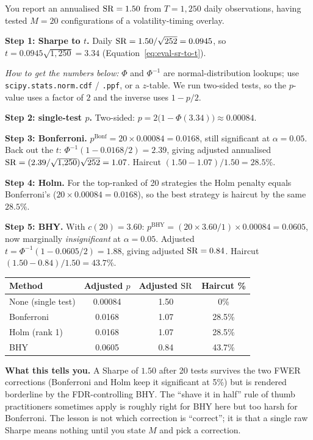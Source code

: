 \begin{workedexample}
You report an annualised $\operatorname{SR} = 1.50$ from $T = 1{,}250$ daily observations, having tested $M = 20$ configurations of a volatility-timing overlay.

\textbf{Step 1: Sharpe to $t$.} Daily $\operatorname{SR} = 1.50/\sqrt{252} = 0.0945$, so $t = 0.0945\sqrt{1{,}250} = 3.34$ (Equation~\eqref{eq:eval-sr-to-t}).

\textit{How to get the numbers below:} $\Phi$ and $\Phi^{-1}$ are normal-distribution lookups; use \texttt{scipy.stats.norm.cdf} / \texttt{.ppf}, or a $z$-table. We run two-sided tests, so the $p$-value uses a factor of $2$ and the inverse uses $1 - p/2$.

\textbf{Step 2: single-test $p$.} Two-sided: $p = 2\bigl(1 - \Phi(3.34)\bigr) \approx 0.00084$.

\textbf{Step 3: Bonferroni.} $p^{\text{Bonf}} = 20 \times 0.00084 = 0.0168$, still significant at $\alpha = 0.05$. Back out the $t$: $\Phi^{-1}(1 - 0.0168/2) = 2.39$, giving adjusted annualised $\operatorname{SR} = (2.39/\sqrt{1{,}250})\sqrt{252} = 1.07$. Haircut $(1.50 - 1.07)/1.50 = 28.5\%$.

\textbf{Step 4: Holm.} For the top-ranked of 20 strategies the Holm penalty equals Bonferroni's ($20 \times 0.00084 = 0.0168$), so the best strategy is haircut by the same $28.5\%$.

\textbf{Step 5: BHY.} With $c(20) = 3.60$: $p^{\text{BHY}} = (20 \times 3.60 / 1)\times 0.00084 = 0.0605$, now marginally \emph{insignificant} at $\alpha = 0.05$. Adjusted $t = \Phi^{-1}(1 - 0.0605/2) = 1.88$, giving adjusted $\operatorname{SR} = 0.84$. Haircut $(1.50 - 0.84)/1.50 = 43.7\%$.

\medskip
\begin{center}
\begin{tabular}{lccc}
\toprule
\textbf{Method} & \textbf{Adjusted $p$} & \textbf{Adjusted $\operatorname{SR}$} & \textbf{Haircut \%} \\
\midrule
None (single test) & 0.00084 & 1.50 & 0\% \\
Bonferroni & 0.0168 & 1.07 & 28.5\% \\
Holm (rank 1) & 0.0168 & 1.07 & 28.5\% \\
BHY & 0.0605 & 0.84 & 43.7\% \\
\bottomrule
\end{tabular}
\end{center}
\medskip

\textbf{What this tells you.}
A Sharpe of $1.50$ after 20 tests survives the two FWER corrections (Bonferroni and Holm keep it significant at 5\%) but is rendered borderline by the FDR-controlling BHY.
The ``shave it in half'' rule of thumb practitioners sometimes apply is roughly right for BHY here but too harsh for Bonferroni.
The lesson is not which correction is ``correct''; it is that a single raw Sharpe means nothing until you state $M$ and pick a correction.
\end{workedexample}

